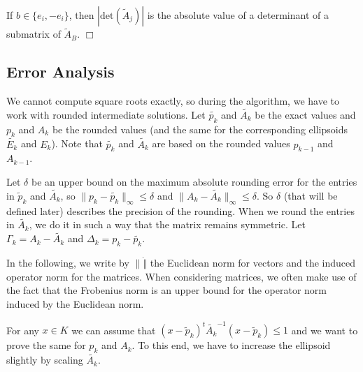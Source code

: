 \documentclass[12pt, showidx, twoside]{article}
\def\prove{\par \noindent \hbox{\bf Proof:}\quad}
\def\endproof{\hfill{$\Box$}}
\def\Q{\mathbb{Q}}
\newcommand{\size}{\text{size}}
\newlength{\boxwidth}
\newcommand{\linebox}[1]{\framebox[\textwidth][c]{\parbox[t]{\boxwidth}{#1}}}
\begin{document}
{{{If $b \in \{e_i,-e_i\}$, then $|\text{det}(\tilde A_j)|$ is the
absolute value of a determinant of a submatrix of
$\tilde A_B$.
\endproof

\iffalse
\subsection{Error Analysis}

We cannot compute square roots exactly, so during the 
algorithm, we have to work with rounded intermediate solutions.
Let $\widetilde{p_k}$ and $\tilde{A_k}$ be the exact values and $p_k$ and
$A_k$ be the rounded values (and the same for the corresponding 
ellipsoids $\tilde{E_k}$ and $E_k$).
Note that $\widetilde{p_k}$ and $\tilde{A_k}$
are based on the rounded values $p_{k-1}$ and $A_{k-1}$.

Let $\delta$ be an upper bound on the maximum absolute rounding 
error for the entries in  $\widetilde p_k$ and $\tilde{A_k}$, so
$\| p_k - \widetilde{p_k}\|_\infty \leq \delta$ and
$\| A_k - \tilde{A_k}\|_\infty \leq \delta$. So $\delta$ (that will
be defined later) describes the precision of the rounding.
When we round the entries in $\tilde{A_k}$, we do it in such a way that
the matrix remains symmetric.
Let $\Gamma_k = A_k - \tilde{A_k}$ and $\Delta_k = p_k - \widetilde{p_k}$.

In the following, we write by $\|\dot\|$ the Euclidean norm for vectors
and the induced operator norm for the matrices. When considering matrices, 
we often make use of the fact that the Frobenius norm is an upper bound
for the operator norm induced by the Euclidean norm.

For any $x \in K$ we can assume that  
$(x - \widetilde p_k)^t \tilde{A_k}^{-1} (x - \widetilde p_k) \leq 1$ and we want
to prove the same for  $p_k$ and $A_k$. To this end, we have to increase
the ellipsoid slightly by scaling $\tilde{A_k}$.

}}}
\end{document}

